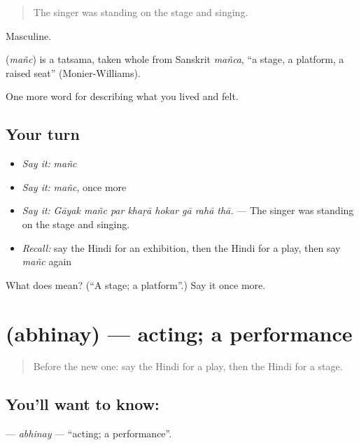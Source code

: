 \begin{quote}
The singer was standing on the stage and singing.
\end{quote}

Masculine.

\begin{cousinweb}
\textbf{} (\emph{mañc}) is a tatsama, taken whole from Sanskrit \emph{mañca}, \textquotedblleft{}a stage, a platform, a raised seat\textquotedblright{} (Monier-Williams).
\end{cousinweb}

\begin{grammarlens}[title={What you've built}]
One more word for describing what you lived and felt.
\end{grammarlens}

\subsection*{Your turn}
\begin{itemize}
\raggedright
  \item \emph{Say it:} \emph{mañc}
  \item \emph{Say it:} \emph{mañc}, once more
  \item \emph{Say it:} \emph{Gāyak mañc par khaṛā hokar gā rahā thā.} — The singer was standing on the stage and singing.
  \item \emph{Recall:} say the Hindi for an exhibition, then the Hindi for a play, then say \emph{mañc} again
\end{itemize}

\begin{tcolorbox}[breakable,colback=teal!4,colframe=teal!35!black,title={Before you move on}]
What does  mean? (\textquotedblleft{}A stage; a platform\textquotedblright{}.) Say it once more.
\end{tcolorbox}
\section[\texorpdfstring{\hi{अभिनय} (abhinay)}{अभिनय (abhinay)}]{ (abhinay) — acting; a performance}

\label{lesson:HI-C529-abhinay}



\begin{quote}
Before the new one: say the Hindi for a play, then the Hindi for a stage.
\end{quote}

\subsection*{You'll want to know: }
\textbf{} — \emph{abhinay} — \textquotedblleft{}acting; a performance\textquotedblright{}.


